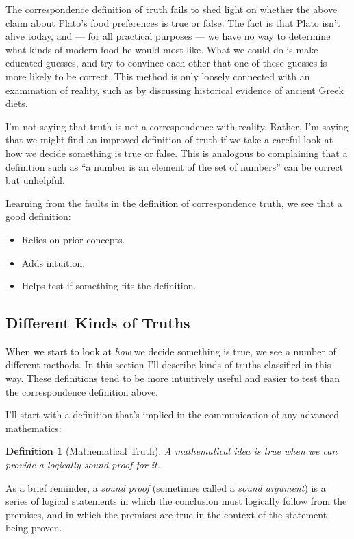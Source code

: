 \documentclass[11pt, oneside]{article}
\newtheorem*{defn}{Definition}
\begin{document}
The correspondence definition of truth fails to shed light
on whether the above claim about Plato's food preferences
is true or false.
The fact is that Plato isn't alive today, and --- for all practical purposes
--- we have no way to determine what kinds of modern food he would most like.
What we could do is make educated guesses, and try to convince each other
that one of these guesses is more likely to be correct.
This method is only loosely connected with an examination of reality, such as by
discussing historical evidence of ancient Greek diets.

I'm not saying that truth is not a correspondence
with reality.
Rather, I'm saying that we might find an improved definition of truth if we take
a careful look at how we decide something is true or false.
This is analogous to complaining that a definition such as ``a number is an
element of the set of numbers'' can be correct but unhelpful.

Learning from the faults in the definition of correspondence truth,
we see that a good definition:
\begin{itemize}
    \item Relies on prior concepts.
    \item Adds intuition.
    \item Helps test if something fits the definition.
\end{itemize}


\subsection{Different Kinds of Truths}

When we start to look at {\em how} we decide something is true, we see a number
of different methods. In this section I'll describe kinds of truths classified
in this way. These definitions tend to be more intuitively useful and easier to
test than the correspondence definition above.

I'll start with a definition that's
implied in the communication of any advanced mathematics:

\begin{defn}[Mathematical Truth]
    A mathematical idea is true when we can provide a logically sound proof for
    it.
\end{defn}

As a brief reminder, a {\em sound proof} (sometimes called a
{\em sound argument}) is a series of logical statements in
which the conclusion must logically follow from the premises, and in which the
premises are true in the context of the statement being proven.
\end{document}
